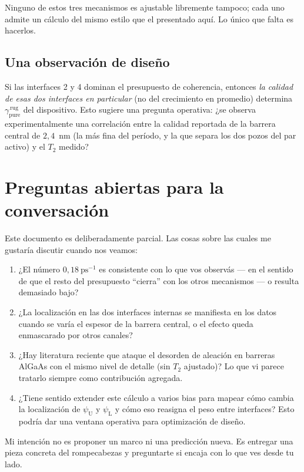 \documentclass[11pt,a4paper]{article}
\begin{document}
Ninguno de estos tres mecanismos es ajustable libremente tampoco; cada uno
admite un cálculo del mismo estilo que el presentado aquí. Lo único que
falta es hacerlos.

\subsection{Una observación de diseño}

Si las interfaces 2 y 4 dominan el presupuesto de coherencia, entonces
\emph{la calidad de esas dos interfaces en particular} (no del crecimiento
en promedio) determina $\gamma_{\mathrm{pure}}^{\,\mathrm{rug}}$ del
dispositivo. Esto sugiere una pregunta operativa: ¿se observa
experimentalmente una correlación entre la calidad reportada de la barrera
central de $2{,}4$~nm (la más fina del período, y la que separa los dos
pozos del par activo) y el $T_2$ medido?

\section{Preguntas abiertas para la conversación}

Este documento es deliberadamente parcial. Las cosas sobre las cuales me
gustaría discutir cuando nos veamos:

\begin{enumerate}
\item ¿El número $0{,}18~\mathrm{ps}^{-1}$ es consistente con lo que vos
      observás --- en el sentido de que el resto del presupuesto ``cierra''
      con los otros mecanismos --- o resulta demasiado bajo?
\item ¿La localización en las dos interfaces internas se manifiesta en los
      datos cuando se varía el espesor de la barrera central, o el efecto
      queda enmascarado por otros canales?
\item ¿Hay literatura reciente que ataque el desorden de aleación en
      barreras AlGaAs con el mismo nivel de detalle (sin $T_2$ ajustado)?
      Lo que vi parece tratarlo siempre como contribución agregada.
\item ¿Tiene sentido extender este cálculo a varios bias para mapear cómo
      cambia la localización de $\psi_\mathrm{U}$ y $\psi_\mathrm{L}$ y
      cómo eso reasigna el peso entre interfaces? Esto podría dar una
      ventana operativa para optimización de diseño.
\end{enumerate}

Mi intención no es proponer un marco ni una predicción nueva. Es entregar
una pieza concreta del rompecabezas y preguntarte si encaja con lo que ves
desde tu lado.
\end{document}
